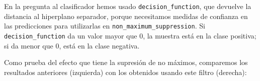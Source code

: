\documentclass[11pt,a4paper]{article}
\begin{document}

                \par
                En la pregunta al clasificador hemos usado \texttt{decision\_function}, que devuelve la distancia al hiperplano separador, porque necesitamos medidas de confianza en las predicciones para utilizarlas en \texttt{non\_maximum\_suppression}. Si \texttt{decision\_function} da un valor mayor que 0, la muestra está en la clase positiva; si da menor que 0, está en la clase negativa.

                \par
                Como prueba del efecto que tiene la supresión de no máximos, comparemos los resultados anteriores (izquierda) con los obtenidos usando este filtro (derecha):
\end{document}
